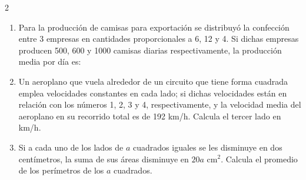 \documentclass[10pt]{article}
\begin{document}
\begin{multicols}{2}
\begin{enumerate}[label=\textbf{\arabic*.}, itemsep=0.4cm]
			\item Para la producción de camisas para exportación se distribuyó la confección entre 3 empresas en cantidades proporcionales a 6, 12 y 4. Si dichas empresas producen 500, 600 y 1000 camisas diarias respectivamente, la producción media por día es:

			\item Un aeroplano que vuela alrededor de un circuito que tiene forma cuadrada emplea velocidades constantes en cada lado; si dichas velocidades están en relación con los números 1, 2, 3 y 4, respectivamente, y la velocidad media del aeroplano en su recorrido total es de 192 km/h. Calcula el tercer lado en km/h.

			\item Si a cada uno de los lados de $a$ cuadrados iguales se les disminuye en dos centímetros, la suma de sus áreas disminuye en $20a$ cm$^2$. Calcula el promedio de los perímetros de los $a$ cuadrados.


		\end{enumerate}

\end{multicols}
\end{document}
